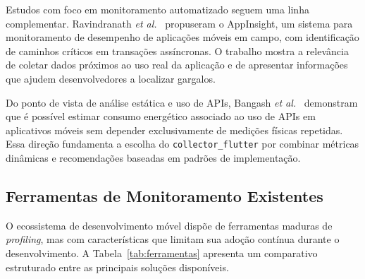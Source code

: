 Estudos com foco em monitoramento automatizado seguem uma linha complementar. Ravindranath \textit{et al.}~\cite{ravindranath2012appinsight} propuseram o AppInsight, um sistema para monitoramento de desempenho de aplicações móveis em campo, com identificação de caminhos críticos em transações assíncronas. O trabalho mostra a relevância de coletar dados próximos ao uso real da aplicação e de apresentar informações que ajudem desenvolvedores a localizar gargalos.

Do ponto de vista de análise estática e uso de APIs, Bangash \textit{et al.}~\cite{bangash2023apienergy} demonstram que é possível estimar consumo energético associado ao uso de APIs em aplicativos móveis sem depender exclusivamente de medições físicas repetidas. Essa direção fundamenta a escolha do \texttt{collector\_flutter} por combinar métricas dinâmicas e recomendações baseadas em padrões de implementação.

\subsection*{Ferramentas de Monitoramento Existentes}

O ecossistema de desenvolvimento móvel dispõe de ferramentas maduras de \textit{profiling}, mas com características que limitam sua adoção contínua durante o desenvolvimento. A Tabela~\ref{tab:ferramentas} apresenta um comparativo estruturado entre as principais soluções disponíveis.


